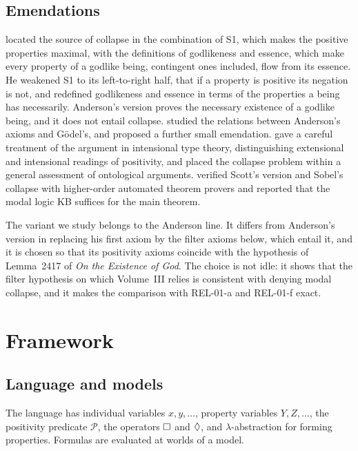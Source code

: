 \documentclass{situationist-preprint}
\newcommand{\Pos}{\mathcal{P}}
\begin{document}
\subsection{Emendations}

\citet{Anderson1990} located the source of collapse in the combination of S1, which makes the positive properties maximal, with the definitions of godlikeness and essence, which make every property of a godlike being, contingent ones included, flow from its essence. He weakened S1 to its left-to-right half, that if a property is positive its negation is not, and redefined godlikeness and essence in terms of the properties a being has necessarily. Anderson's version proves the necessary existence of a godlike being, and it does not entail collapse. \citet{Hajek2002} studied the relations between Anderson's axioms and Gödel's, and proposed a further small emendation. \citet{Fitting2002} gave a careful treatment of the argument in intensional type theory, distinguishing extensional and intensional readings of positivity, and \citet{Sobel2004} placed the collapse problem within a general assessment of ontological arguments. \citet{Benzmuller2014} verified Scott's version and Sobel's collapse with higher-order automated theorem provers and reported that the modal logic KB suffices for the main theorem.

The variant we study belongs to the Anderson line. It differs from Anderson's version in replacing his first axiom by the filter axioms below, which entail it, and it is chosen so that its positivity axioms coincide with the hypothesis of Lemma~2417 of \emph{On the Existence of God}. The choice is not idle: it shows that the filter hypothesis on which Volume~III relies is consistent with denying modal collapse, and it makes the comparison with REL-01-a and REL-01-f exact.

\section{Framework}\label{s:framework}

\subsection{Language and models}

The language has individual variables $x, y, \ldots$, property variables $Y, Z, \ldots$, the positivity predicate $\Pos$, the operators $\mathord{\Box}$ and $\mathord{\Diamond}$, and $\lambda$-abstraction for forming properties. Formulas are evaluated at worlds of a model.
\end{document}
